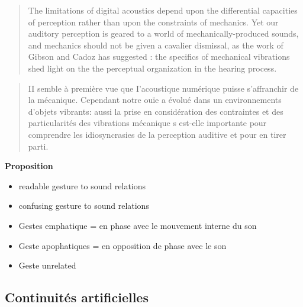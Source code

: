 \begin{quotation}
The limitations of digital acoustics depend upon the differential capacities of perception rather than upon the constraints of mechanics. Yet our auditory perception is geared to a world of mechanically-produced sounds, and mechanics should not be given a cavalier dismissal, as the work of Gibson and Cadoz has suggested : the specifics of mechanical vibrations shed light on the the perceptual organization in the hearing process.
\end{quotation}

\begin{quotation}
II semble à première  vue  que I'acoustique  numérique puisse  s'affranchir  de la mécanique. Cependant notre ouïe  a  évolué dans un  environnements d'objets vibrants: aussi la prise en considération  des  contraintes et des  particularités  des  vibrations  mécanique s  est-elle importante  pour  comprendre  les  idiosyncrasies de la perception  auditive et pour  en  tirer parti.
\end{quotation}


\textbf{Proposition}
\vspace{-1em}
\begin{itemize}[noitemsep]
\item readable gesture to sound relations
\item confusing gesture to sound relations
\end{itemize}

\vspace{-1em}
\begin{itemize}[noitemsep]
\item Gestes emphatique = en phase avec le mouvement interne du son
\item Geste apophatiques = en opposition de phase avec le son
\item Geste unrelated
\end{itemize}

\subsection{Continuités artificielles}

